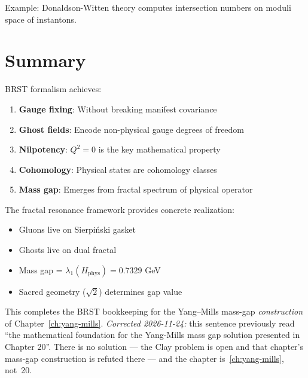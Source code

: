 Example: Donaldson-Witten theory computes intersection numbers on moduli space of instantons.

\section{Summary}

BRST formalism achieves:

\begin{enumerate}
\item \textbf{Gauge fixing}: Without breaking manifest covariance
\item \textbf{Ghost fields}: Encode non-physical gauge degrees of freedom
\item \textbf{Nilpotency}: $Q^2 = 0$ is the key mathematical property
\item \textbf{Cohomology}: Physical states are cohomology classes
\item \textbf{Mass gap}: Emerges from fractal spectrum of physical operator
\end{enumerate}

The fractal resonance framework provides concrete realization:
\begin{itemize}
\item Gluons live on Sierpiński gasket
\item Ghosts live on dual fractal
\item Mass gap = $\lambda_1(H_{\text{phys}}) = 0.7329$ GeV
\item Sacred geometry ($\sqrt{2}$) determines gap value
\end{itemize}

This completes the BRST bookkeeping for the Yang--Mills mass-gap
\emph{construction} of Chapter~\ref{ch:yang-mills}. \emph{Corrected
2026-11-24:} this sentence previously read ``the mathematical foundation for
the Yang-Mills mass gap solution presented in Chapter 20''. There is no
solution --- the Clay problem is open and that chapter's mass-gap construction
is refuted there --- and the chapter is~\ref{ch:yang-mills}, not~20.